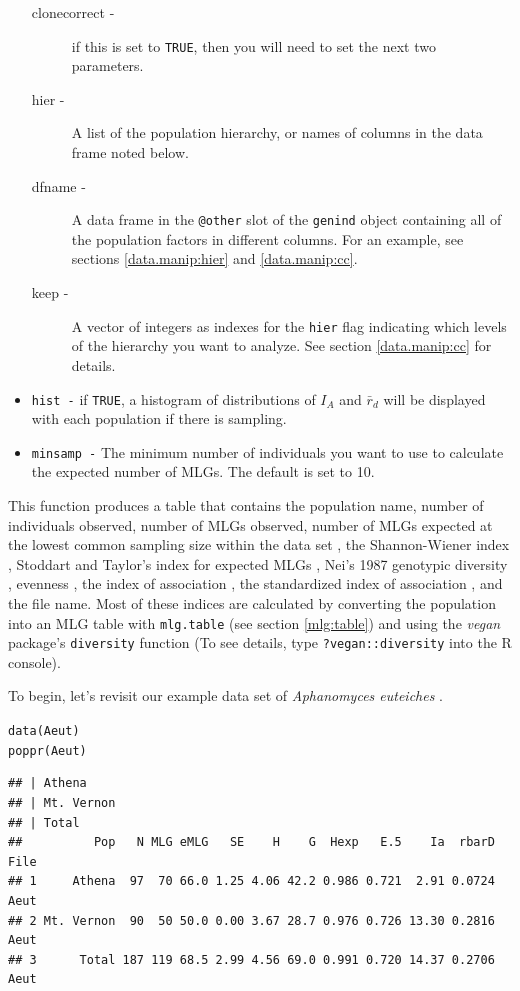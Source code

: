 \documentclass[letterpaper]{article}\usepackage[]{graphicx}\usepackage[]{color}
\makeatletter
\newcommand{\hlstd}[1]{\textcolor[rgb]{0,0,0}{#1}}%
\newcommand{\hlkwd}[1]{\textcolor[rgb]{0,0.267,0.4}{#1}}%
\newenvironment{kframe}{%
 \def\at@end@of@kframe{}%
 \ifinner\ifhmode%
  \def\at@end@of@kframe{\end{minipage}}%
  \begin{minipage}{\columnwidth}%
 \fi\fi%
 \def\FrameCommand##1{\hskip\@totalleftmargin \hskip-\fboxsep
 \colorbox{shadecolor}{##1}\hskip-\fboxsep
     \hskip-\linewidth \hskip-\@totalleftmargin \hskip\columnwidth}%
 \MakeFramed {\advance\hsize-\width
   \@totalleftmargin\z@ \linewidth\hsize
   \@setminipage}}%
 {\par\unskip\endMakeFramed%
 \at@end@of@kframe}
\newenvironment{knitrout}{}{} %
\makeatother
\begin{document}
\begin{itemize}
\begin{description}
    \item[clonecorrect -] if this is set to \texttt{TRUE}, then you will need to set the next two parameters.
    \item[hier -] A list of the population hierarchy, or names of columns in the data frame noted below.
    \item[dfname -] A data frame in the \texttt{@other} slot of the \texttt{genind} object containing all of the population factors in different columns. For an example, see sections \ref{data.manip:hier} and \ref{data.manip:cc}.
    \item[keep -] A vector of integers as indexes for the \texttt{hier} flag indicating which levels of the hierarchy you want to analyze. See section \ref{data.manip:cc} for details. 
  \end{description}
  \item \texttt{hist -} if \texttt{TRUE}, a histogram of distributions of $I_A$ and $\bar r_d$ will be displayed with each population if there is sampling.
  \item \texttt{minsamp -} The minimum number of individuals you want to use to calculate the expected number of MLGs. The default is set to 10.
\end{itemize}

This function produces a table that contains the population name, number of individuals observed, number of MLGs observed, number of MLGs expected at the lowest common sampling size within the data set \cite{Hurlbert:1971} \cite{Heck:1975}, the Shannon-Wiener index \cite{Shannon:1948}, Stoddart and Taylor's index for expected MLGs \cite{Stoddart:1988}, Nei's 1987 genotypic diversity \cite{Nei:1978}, evenness \cite{Pielou:1975}\cite{Ludwig:1988}\cite{Grunwald:2003}, the index of association \cite{Brown:1980}\cite{Smith:1993}, the standardized index of association \cite{Agapow:2001}, and the file name. Most of these indices are calculated by converting the population into an MLG table with \texttt{mlg.table} (see section \ref{mlg:table}) and using the \textit{vegan} package's \texttt{diversity} function (To see details, type \texttt{?vegan::diversity} into the R console).

To begin, let's revisit our example data set of \textit{Aphanomyces euteiches} \cite{Grunwald:2006}.
\begin{knitrout}\footnotesize
{}\color{fgcolor}\begin{kframe}
\begin{alltt}
\hlkwd{data}\hlstd{(Aeut)}
\hlkwd{poppr}\hlstd{(Aeut)}
\end{alltt}
\begin{verbatim}
## | Athena 
## | Mt. Vernon 
## | Total
##          Pop   N MLG eMLG   SE    H    G  Hexp   E.5    Ia  rbarD File
## 1     Athena  97  70 66.0 1.25 4.06 42.2 0.986 0.721  2.91 0.0724 Aeut
## 2 Mt. Vernon  90  50 50.0 0.00 3.67 28.7 0.976 0.726 13.30 0.2816 Aeut
## 3      Total 187 119 68.5 2.99 4.56 69.0 0.991 0.720 14.37 0.2706 Aeut
\end{verbatim}
\end{kframe}
\end{knitrout}
\end{document}

